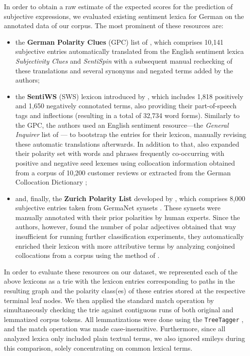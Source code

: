 In order to obtain a raw estimate of the expected scores for the
prediction of subjective expressions, we evaluated existing sentiment
lexica for German on the annotated data of our corpus.  The most
prominent of these resources are:
\begin{itemize}
\item the \textbf{German Polarity Clues} (GPC) list of
  \citet{Waltinger:10}, which comprises 10,141 subjective entries
  automatically translated from the English sentiment lexica
  \emph{Subjectivity Clues} \cite{Wilson:05} and \emph{SentiSpin}
  \cite{Takamura:05} with a subsequent manual rechecking of these
  translations and several synonyms and negated terms added by the
  authors;

\item the \textbf{SentiWS} (SWS) lexicon introduced by
  \citet{Remus:10}, which includes 1,818 positively and 1,650
  negatively connotated terms, also providing their part-of-speech
  tags and inflections (resulting in a total of 32,734 word forms).
  Similarly to the GPC, the authors used an English sentiment
  resource---the \emph{General Inquirer} list of \citet{Stone:66}---
  to bootstrap the entries for their lexicon, manually revising these
  automatic translations afterwards.  In addition to that,
  \citet{Remus:10} also expanded their polarity set with words and
  phrases frequently co-occurring with positive and negative seed
  lexemes using collocation information obtained from a corpus of
  10,200 customer reviews or extracted from the German Collocation
  Dictionary \cite{Quasthoff:10};

\item and, finally, the \textbf{Zurich Polarity List} developed by
  \citet{Clematide:10}, which comprises 8,000 subjective entries taken
  from GermaNet synsets \cite{Hamp:97}.  These synsets were manually
  annotated with their prior polarities by human experts.  Since the
  authors, however, found the number of polar adjectives obtained that
  way insufficient for running further classification experiments,
  they automatically enriched their lexicon with more attributive
  terms by analyzing conjoined collocations from a corpus using the
  method of \citet{Hatzivassi:97}.
\end{itemize}

In order to evaluate these resources on our dataset, we represented
each of the above lexicons as a trie \cite[pp. 492--512]{Knuth:98}
with the lexicon entries corresponding to paths in the resulting graph
and the polarity class(es) of these entries stored at the respective
terminal leaf nodes.  We then applied the standard match operation by
simultaneously checking the trie against contiguous runs of both
original and lemmatized corpus tokens.  All lemmatizations were done
using the \texttt{TreeTagger} \cite{Schmid:95}, and the match
operation was made case-insensitive.  Furthermore, since all analyzed
lexica only included plain textual terms, we also ignored smileys
during this comparison, solely concentrating on common lexical terms.

